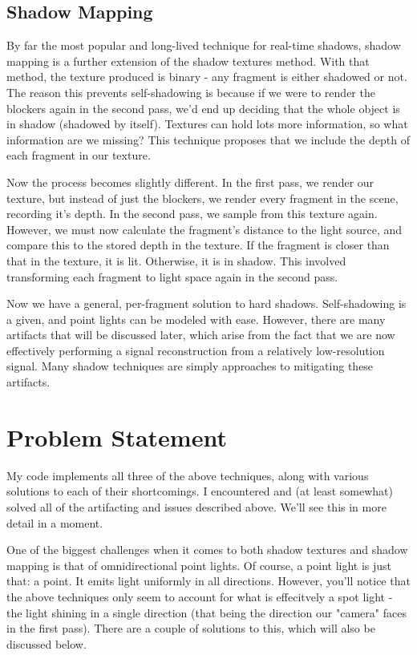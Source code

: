 \documentclass[acmsmall, screen, authorversion, nonacm]{acmart}
\begin{document}
\subsection{Shadow Mapping}

By far the most popular and long-lived technique for real-time shadows\cite{akenine2019real}, shadow mapping is a further extension of the shadow textures method. With that method, the texture produced is binary - any fragment is either shadowed or not. The reason this prevents self-shadowing is because if we were to render the blockers again in the second pass, we'd end up deciding that the whole object is in shadow (shadowed by itself). Textures can hold lots more information, so what information are we missing? This technique proposes that we include the depth of each fragment in our texture\cite{williams78}.

Now the process becomes slightly different. In the first pass, we render our texture, but instead of just the blockers, we render every fragment in the scene, recording it's depth. In the second pass, we sample from this texture again. However, we must now calculate the fragment's distance to the light source, and compare this to the stored depth in the texture. If the fragment is closer than that in the texture, it is lit. Otherwise, it is in shadow. This involved transforming each fragment to light space again in the second pass.

Now we have a general, per-fragment solution to hard shadows. Self-shadowing is a given, and point lights can be modeled with ease. However, there are many artifacts that will be discussed later, which arise from the fact that we are now effectively performing a signal reconstruction from a relatively low-resolution signal. Many shadow techniques are simply approaches to mitigating these artifacts\cite{eisemann2011real}.

\section{Problem Statement}

My code implements all three of the above techniques, along with various solutions to each of their shortcomings. I encountered and (at least somewhat) solved all of the artifacting and issues described above. We'll see this in more detail in a moment.

One of the biggest challenges when it comes to both shadow textures and shadow mapping is that of omnidirectional point lights. Of course, a point light is just that: a point. It emits light uniformly in all directions. However, you'll notice that the above techniques only seem to account for what is effecitvely a spot light - the light shining in a single direction (that being the direction our "camera" faces in the first pass). There are a couple of solutions to this, which will also be discussed below.
\end{document}
